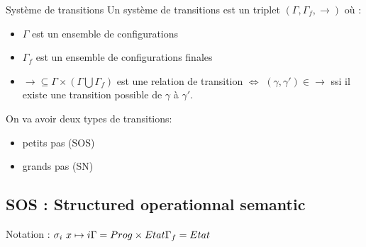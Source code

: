 \documentclass[10pt,a4paper]{article}
\begin{document}
\begin{definition}{Système de transitions} Un système de transitions est un triplet $(\Gamma, \Gamma_f, \rightarrow )$ où :\begin{itemize}
\item $\Gamma$ est un ensemble de configurations
\item $\Gamma_f$ est un ensemble de configurations finales
\item $\rightarrow \subseteq \Gamma \times (\Gamma \bigcup \Gamma_f )$ est une relation de transition $\Leftrightarrow$
$(\gamma, \gamma' ) \in \rightarrow$ ssi il existe une transition possible de $\gamma$ à $\gamma'$.
\end{itemize}
\end{definition}

On va avoir deux types de transitions: \begin{itemize}
\item petits pas (SOS)
\item grands pas (SN)
\end{itemize}

\subsection{SOS : Structured operationnal semantic}
\noindent Notation : $\sigma_i ~ x \mapsto i\\
\Gamma = Prog \times Etat\\
\Gamma_f = Etat$
\end{document}
